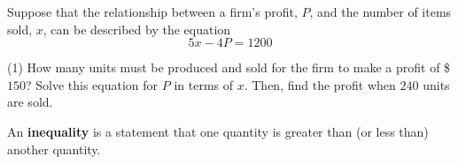 \documentclass[../mathNotesPreamble]{subfiles}
\begin{document}
  \begin{ex*}
    Suppose that the relationship between a firm's profit, $P$, and the number of items sold, $x$, can be described by the equation
      \[5x-4P=1200\]
    \begin{tasks}[after-item-skip=\stretch{1}](1)
      \task How many units must be produced and sold for the firm to make a profit of \$$150$?
      \task Solve this equation for $P$ in terms of $x$. Then, find the profit when $240$ units are sold.
    \end{tasks}
  \end{ex*}
  \pagebreak

  \begin{defn*}
    An \textbf{inequality} is a statement that one quantity is greater than (or less than) another quantity.
  \end{defn*}

  
  \pagebreak
\end{document}
